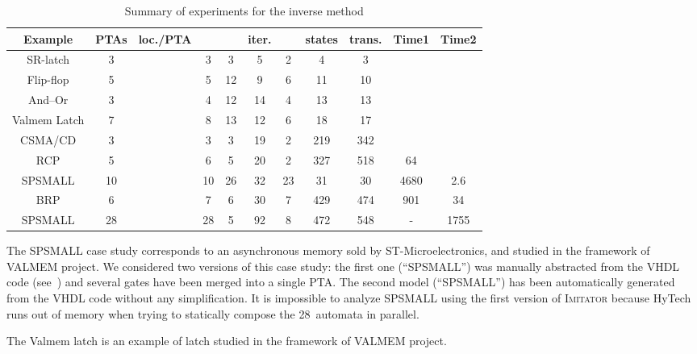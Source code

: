 \documentclass[submission,copyright,creativecommons]{eptcs}
\newcommand{\hytech}{{\sc HyTech}}
\newcommand{\imitator}{\textsc{Imitator}}
\begin{document}
\begin{table}[ht!]

\centering

\small

\begin{tabular}{|@{\,}c@{\,}||@{\,}c@{\,}|@{\,}c@{\,}|@{\,}c@{\,}|@{\,}c@{\,}||@{\,}c@{\,}|@{\,}c@{\,}|@{\,}c@{\,}|@{\,}c@{\,}||@{\,}c@{\,}|@{\,}c@{\,}|}
\hline
	Example & PTAs & loc./PTA & &  & iter. &  & states & trans. & Time1 & Time2 \\
\hline
	SR-latch & 3 &  & 3 & 3 & 5 & 2 & 4 & 3 &  &  \\
\hline
	Flip-flop \cite{cc07} & 5 &  & 5 & 12 & 9 & 6 & 11 & 10 &  &  \\
\hline
	And--Or \cite{cc05} & 3 &  & 4 & 12 & 14 & 4 & 13 & 13 &  &  \\
\hline
	Valmem Latch & 7 &  & 8 & 13 & 12 & 6 & 18 & 17 &  &  \\
\hline
	CSMA/CD \cite{knsw07} & 3 &  & 3 & 3 & 19 & 2 & 219 & 342 &  &  \\
\hline
	RCP \cite{kns03} & 5 &  & 6 & 5 & 20 & 2 & 327 & 518 & 64 &  \\
\hline
	SPSMALL \cite{cefx09} & 10 &  & 10 & 26 & 32 & 23 & 31 & 30 & 4680 & 2.6 \\
\hline
	BRP \cite{dkrt97} & 6 &  & 7 & 6 & 30 & 7 & 429 & 474 & 901 & 34 \\
\hline
	SPSMALL \cite{cefx09} & 28 &  & 28 & 5 & 92 & 8 & 472 & 548 & - & 1755 \\
\hline
\end{tabular}

\caption{Summary of experiments for the inverse method}
\label{table:experiments-IM}
\end{table}


The SPSMALL case study corresponds to an asynchronous memory sold by ST-Microelectronics, and studied in the framework of VALMEM project.
We considered two versions of this case study: the first one (``SPSMALL'') was manually abstracted from the VHDL code (see~\cite{cefx09}) and several gates have been merged into a single PTA.
The second model (``SPSMALL'') has been automatically generated from the VHDL code without any simplification.
It is impossible to analyze SPSMALL using the first version of \imitator{} because \hytech{} runs out of memory when trying to statically compose the 28~automata in parallel.

The Valmem latch is an example of latch studied in the framework of VALMEM project.
\end{document}
